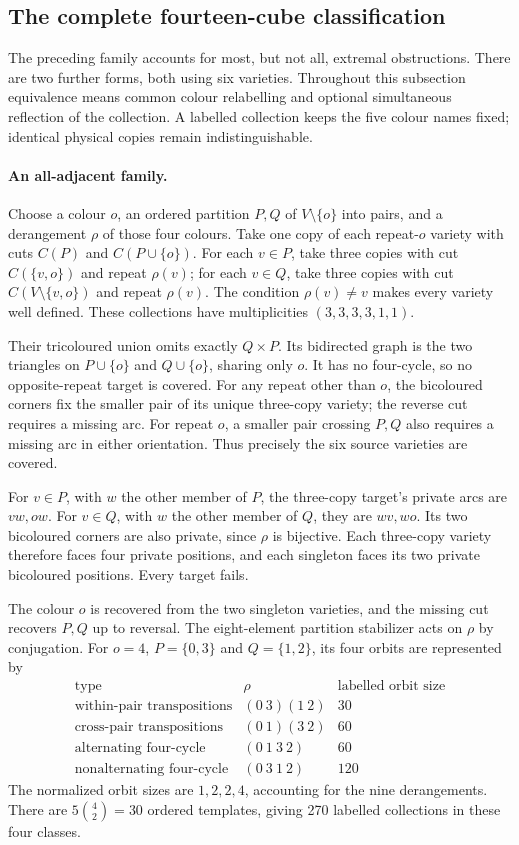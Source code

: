 \subsection{The complete fourteen-cube classification}\label{sec:classification14}
The preceding family accounts for most, but not all, extremal obstructions.
There are two further forms, both using six varieties. Throughout this
subsection equivalence means common colour relabelling and optional
simultaneous reflection of the collection. A labelled collection keeps the
five colour names fixed; identical physical copies remain indistinguishable.

\paragraph{An all-adjacent family.}
Choose a colour $o$, an ordered partition $P,Q$ of $V\setminus\{o\}$ into
pairs, and a derangement $\rho$ of those four colours. Take one copy of each
repeat-$o$ variety with cuts $C(P)$ and $C(P\cup\{o\})$. For each $v\in P$,
take three copies with cut $C(\{v,o\})$ and repeat $\rho(v)$; for each
$v\in Q$, take three copies with cut $C(V\setminus\{v,o\})$ and repeat
$\rho(v)$. The condition $\rho(v)\ne v$ makes every variety well defined.
These collections have multiplicities $(3,3,3,3,1,1)$.

Their tricoloured union omits exactly $Q\times P$. Its bidirected graph is
the two triangles on $P\cup\{o\}$ and $Q\cup\{o\}$, sharing only $o$.
It has no four-cycle, so no opposite-repeat target is covered. For any
repeat other than $o$, the bicoloured corners fix the smaller pair of its
unique three-copy variety; the reverse cut requires a missing arc.
For repeat $o$, a smaller pair crossing $P,Q$ also requires a missing arc
in either orientation. Thus precisely the six source varieties are covered.

For $v\in P$, with $w$ the other member of $P$, the three-copy target's
private arcs are $vw,ow$. For $v\in Q$, with $w$ the other member of $Q$,
they are $wv,wo$. Its two bicoloured corners are also private, since $\rho$
is bijective. Each three-copy variety therefore faces four private positions, and each
singleton faces its two private bicoloured positions. Every target fails.

The colour $o$ is recovered from the two singleton varieties, and the
missing cut recovers $P,Q$ up to reversal. The eight-element partition
stabilizer acts on $\rho$ by conjugation. For $o=4$, $P=\{0,3\}$ and
$Q=\{1,2\}$, its four orbits are represented by
\[
\begin{array}{c|c|r}
 \text{type}&\rho&\text{labelled orbit size}\\\hline
 \text{within-pair transpositions}&(0\ 3)(1\ 2)&30\\
 \text{cross-pair transpositions}&(0\ 1)(3\ 2)&60\\
 \text{alternating four-cycle}&(0\ 1\ 3\ 2)&60\\
 \text{nonalternating four-cycle}&(0\ 3\ 1\ 2)&120
\end{array}
\]
The normalized orbit sizes are $1,2,2,4$, accounting for the nine
derangements. There are $5\binom42=30$ ordered templates, giving 270
labelled collections in these four classes.

